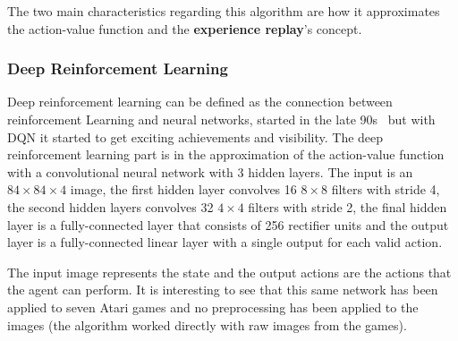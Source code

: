 The two main characteristics regarding this algorithm are how it approximates the action-value function and the \textbf{experience replay}'s concept.
\subsubsection{Deep Reinforcement Learning}
Deep reinforcement learning can be defined as the connection between reinforcement Learning and neural networks, started in the late 90s~\cite{Tesauro1994} but with DQN it started to get exciting achievements and visibility. The deep reinforcement learning part is in the approximation of the action-value function with a convolutional neural network with 3 hidden layers. The input is an $84 \times 84 \times 4$ image, the first hidden layer convolves 16 $8 \times 8$ filters with stride 4, the second hidden layers convolves 32 $4 \times 4$ filters with stride 2, the final hidden layer is a fully-connected layer that consists of 256 rectifier units and the output layer is a fully-connected linear layer with a single output for each valid action.

The input image represents the state and the output actions are the actions that the agent can perform. It is interesting to see that this same network has been applied to seven Atari games and no preprocessing has been applied to the images (the algorithm worked directly with raw images from the games).

